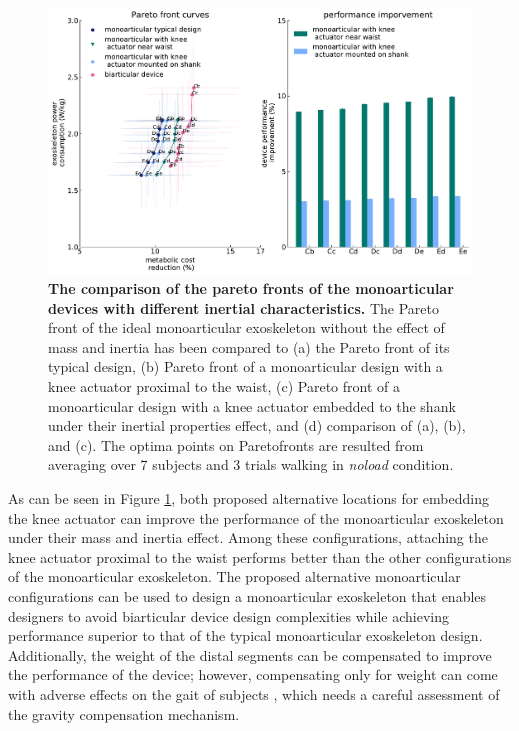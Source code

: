 \documentclass[10pt,letterpaper]{article}
\begin{document}
\begin{figure}[ht]   
	\centering
	\includegraphics[width=\linewidth]{Pareto_Mass_Regenration_Figures/PaperFigure_MonoarticularExoskeleton_DifferentConfigs.pdf}
	\vspace{1mm}
	\caption{{\small\textbf{The comparison of the pareto fronts of the monoarticular devices with different inertial characteristics.} The Pareto front of the ideal monoarticular exoskeleton without the effect of mass and inertia has been compared to (a) the Pareto front of its typical design, (b) Pareto front of a monoarticular design with a knee actuator proximal to the waist, (c) Pareto front of a monoarticular design with a knee actuator embedded to the shank under their inertial properties effect, and (d) comparison of (a), (b), and (c). The optima points on Paretofronts are resulted from averaging over 7 subjects and 3 trials walking in {\it noload} condition.}}
	\label{Fig_MonoarticularExoskeleton_DifferentConfigs}
\end{figure}
As can be seen in Figure  \ref{Fig_MonoarticularExoskeleton_DifferentConfigs}, both proposed alternative locations for embedding the knee actuator can improve the performance of the monoarticular exoskeleton under their mass and inertia effect. Among these configurations, attaching the knee actuator proximal to the waist performs better than the other configurations of the monoarticular exoskeleton. The proposed alternative monoarticular configurations can be used to design a monoarticular exoskeleton that enables designers to avoid biarticular device design complexities while achieving performance superior to that of the typical monoarticular exoskeleton design. Additionally, the weight of the distal segments can be compensated to improve the performance of the device; however, compensating only for weight can come with adverse effects on the gait of subjects \cite{179}, which needs a careful assessment of the gravity compensation mechanism.\\
\end{document}
